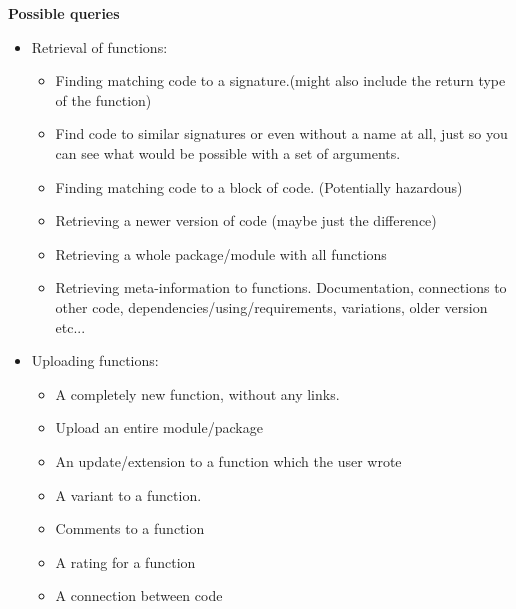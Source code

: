 \documentclass[11p]{scrartcl}
\begin{document}
\textbf{Possible queries}
\begin{itemize}
	\item Retrieval of functions:
	\begin{itemize}
		\item Finding matching code to  a signature.(might also include the return type of the function)
		\item Find code to similar signatures or even without a name at all, just so you can see what would be possible with a set of arguments.
		\item Finding matching code to a block of code. (Potentially hazardous)
		\item Retrieving a newer version of code (maybe just the difference)
		\item Retrieving a whole package/module with all functions
		\item Retrieving meta-information to functions. Documentation, connections to other code, dependencies/using/requirements, variations, older version etc... 
		\end{itemize}
	\item Uploading functions:
	\begin{itemize}
		\item A completely new function, without any links. 
		\item Upload an entire module/package
		\item An update/extension to a function which the user wrote
		\item A variant to a function.
		\item Comments to a function
		\item A rating for a function
		\item A connection between code 
	\end{itemize}		
\end{itemize}

	 
\end{document}
